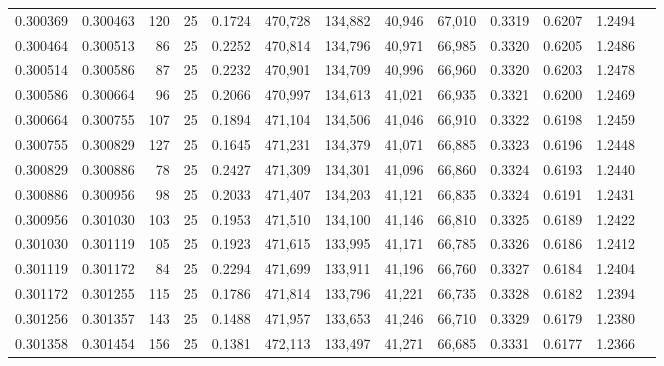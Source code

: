 \begin{tabular}{rrrrrrrrrrrrr}
0.300369 & 0.300463 &   120 &  25 &                                     0.1724 & 470,728 & 134,882 &  40,946 &  67,010 & 0.3319 & 0.6207 & 1.2494 \\
0.300464 & 0.300513 &    86 &  25 &                                     0.2252 & 470,814 & 134,796 &  40,971 &  66,985 & 0.3320 & 0.6205 & 1.2486 \\
0.300514 & 0.300586 &    87 &  25 &                                     0.2232 & 470,901 & 134,709 &  40,996 &  66,960 & 0.3320 & 0.6203 & 1.2478 \\
0.300586 & 0.300664 &    96 &  25 &                                     0.2066 & 470,997 & 134,613 &  41,021 &  66,935 & 0.3321 & 0.6200 & 1.2469 \\
0.300664 & 0.300755 &   107 &  25 &                                     0.1894 & 471,104 & 134,506 &  41,046 &  66,910 & 0.3322 & 0.6198 & 1.2459 \\
0.300755 & 0.300829 &   127 &  25 &                                     0.1645 & 471,231 & 134,379 &  41,071 &  66,885 & 0.3323 & 0.6196 & 1.2448 \\
0.300829 & 0.300886 &    78 &  25 &                                     0.2427 & 471,309 & 134,301 &  41,096 &  66,860 & 0.3324 & 0.6193 & 1.2440 \\
0.300886 & 0.300956 &    98 &  25 &                                     0.2033 & 471,407 & 134,203 &  41,121 &  66,835 & 0.3324 & 0.6191 & 1.2431 \\
0.300956 & 0.301030 &   103 &  25 &                                     0.1953 & 471,510 & 134,100 &  41,146 &  66,810 & 0.3325 & 0.6189 & 1.2422 \\
0.301030 & 0.301119 &   105 &  25 &                                     0.1923 & 471,615 & 133,995 &  41,171 &  66,785 & 0.3326 & 0.6186 & 1.2412 \\
0.301119 & 0.301172 &    84 &  25 &                                     0.2294 & 471,699 & 133,911 &  41,196 &  66,760 & 0.3327 & 0.6184 & 1.2404 \\
0.301172 & 0.301255 &   115 &  25 &                                     0.1786 & 471,814 & 133,796 &  41,221 &  66,735 & 0.3328 & 0.6182 & 1.2394 \\
0.301256 & 0.301357 &   143 &  25 &                                     0.1488 & 471,957 & 133,653 &  41,246 &  66,710 & 0.3329 & 0.6179 & 1.2380 \\
0.301358 & 0.301454 &   156 &  25 &                                     0.1381 & 472,113 & 133,497 &  41,271 &  66,685 & 0.3331 & 0.6177 & 1.2366 \\

\end{tabular}

